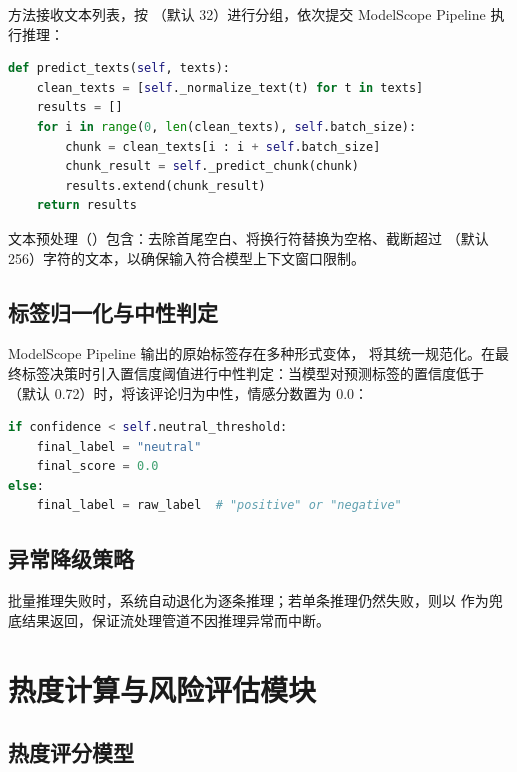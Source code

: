  方法接收文本列表，按 （默认 32）进行分组，依次提交 ModelScope Pipeline 执行推理：

\begin{lstlisting}[language=Python, caption={批量推理主流程}, label={lst:batch}]
def predict_texts(self, texts):
    clean_texts = [self._normalize_text(t) for t in texts]
    results = []
    for i in range(0, len(clean_texts), self.batch_size):
        chunk = clean_texts[i : i + self.batch_size]
        chunk_result = self._predict_chunk(chunk)
        results.extend(chunk_result)
    return results
\end{lstlisting}

文本预处理（）包含：去除首尾空白、将换行符替换为空格、截断超过 （默认 256）字符的文本，以确保输入符合模型上下文窗口限制。

\subsection{标签归一化与中性判定}

ModelScope Pipeline 输出的原始标签存在多种形式变体， 将其统一规范化。在最终标签决策时引入置信度阈值进行中性判定：当模型对预测标签的置信度低于 （默认 0.72）时，将该评论归为中性，情感分数置为 0.0：

\begin{lstlisting}[language=Python, caption={中性阈值判定逻辑}, label={lst:neutral}]
if confidence < self.neutral_threshold:
    final_label = "neutral"
    final_score = 0.0
else:
    final_label = raw_label  # "positive" or "negative"
\end{lstlisting}

\subsection{异常降级策略}

批量推理失败时，系统自动退化为逐条推理；若单条推理仍然失败，则以  作为兜底结果返回，保证流处理管道不因推理异常而中断。

\section{热度计算与风险评估模块}

\subsection{热度评分模型}

